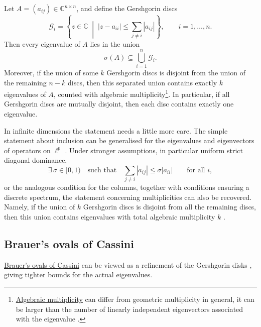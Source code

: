 \documentclass{article}
\theoremstyle{definition}
\begin{document}
Let $A=(a_{ij})\in\mathbb{C}^{n\times n}$, and define the Gershgorin discs
\begin{equation}
    \mathcal{G}_i
    =
    \left\{
        z\in\mathbb{C}
        \;\middle|\;
        |z-a_{ii}|
        \le
        \sum_{j\neq i}|a_{ij}|
    \right\},
    \qquad i=1,\ldots,n.
\end{equation}
Then every eigenvalue of $A$ lies in the union
\begin{equation}
    \sigma(A)\subseteq\bigcup_{i=1}^{n}\mathcal{G}_i.
\end{equation}
Moreover, if the union of some $k$ Gershgorin discs is disjoint from the union of the remaining $n-k$ discs, then this separated union contains exactly $k$ eigenvalues of $A$, counted with algebraic multiplicity\footnote{\href{https://en.wikipedia.org/wiki/Eigenvalues\_and\_eigenvectors\#Algebraic\_multiplicity}{Algebraic multiplicity} can differ from geometric multiplicity in general, it can be larger than the number of linearly independent eigenvectors associated with the eigenvalue \cite{book:HornJohnson2013MatrixAnalysis,book:GolubVanLoan1996}.}.
In particular, if all Gershgorin discs are mutually disjoint, then each disc contains exactly one eigenvalue.

In infinite dimensions the statement needs a little more care. The simple statement about inclusion can be generalised for the eigenvalues and eigenvectors of operators on $\ell^p$ \cite{paper:GersgorinShivakumarWilliamsRudraiah1987}. Under stronger assumptions, in particular uniform strict diagonal dominance,
\begin{equation}
    \exists\,\sigma\in[0,1)
    \quad\text{such that}\quad
    \sum_{j\neq i}|a_{ij}|
    \leq
    \sigma |a_{ii}|
    \qquad\text{for all }i,
\end{equation}
or the analogous condition for the columns, together with conditions ensuring a discrete spectrum, the statement concerning multiplicities can also be recovered. Namely, if the union of $k$ Gershgorin discs is disjoint from all the remaining discs, then this union contains eigenvalues with total algebraic multiplicity $k$ \cite{paper:GersgorinFarid1989}.

\subsection{Brauer's ovals of Cassini}

\href{https://bwlewis.github.io/cassini/}{Brauer's ovals of Cassini} can be viewed as a refinement of the Gershgorin disks \cite{book:Varga2004Gersgorin}, giving tighter bounds for the actual eigenvalues.
\end{document}
